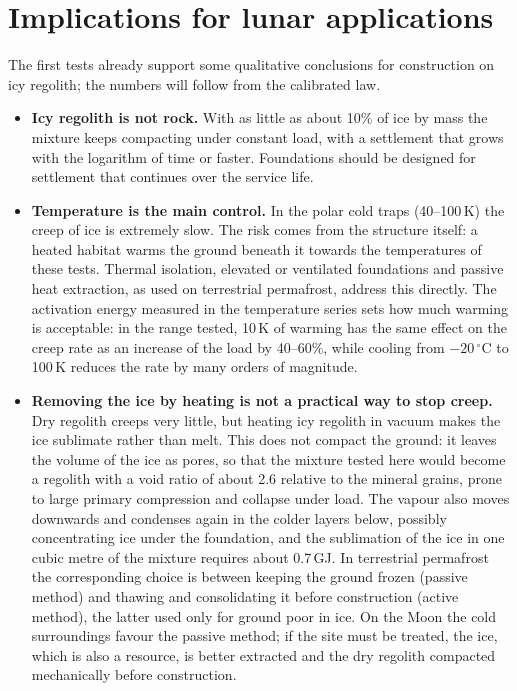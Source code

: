 \section{Implications for lunar applications}
\label{sec:implications}

The first tests already support some qualitative conclusions for construction on icy regolith; the numbers will follow from the calibrated law.
\begin{itemize}
    \item \textbf{Icy regolith is not rock.} With as little as about 10\% of ice by mass the mixture keeps compacting under constant load, with a settlement that grows with the logarithm of time or faster. Foundations should be designed for settlement that continues over the service life.
    \item \textbf{Temperature is the main control.} In the polar cold traps (40--100\,K) the creep of ice is extremely slow. The risk comes from the structure itself: a heated habitat warms the ground beneath it towards the temperatures of these tests. Thermal isolation, elevated or ventilated foundations and passive heat extraction, as used on terrestrial permafrost, address this directly. The activation energy measured in the temperature series sets how much warming is acceptable: in the range tested, 10\,K of warming has the same effect on the creep rate as an increase of the load by 40--60\%, while cooling from $-20\,^\circ$C to 100\,K reduces the rate by many orders of magnitude.
    \item \textbf{Removing the ice by heating is not a practical way to stop creep.} Dry regolith creeps very little, but heating icy regolith in vacuum makes the ice sublimate rather than melt. This does not compact the ground: it leaves the volume of the ice as pores, so that the mixture tested here would become a regolith with a void ratio of about 2.6 relative to the mineral grains, prone to large primary compression and collapse under load. The vapour also moves downwards and condenses again in the colder layers below, possibly concentrating ice under the foundation, and the sublimation of the ice in one cubic metre of the mixture requires about 0.7\,GJ. In terrestrial permafrost the corresponding choice is between keeping the ground frozen (passive method) and thawing and consolidating it before construction (active method), the latter used only for ground poor in ice. On the Moon the cold surroundings favour the passive method; if the site must be treated, the ice, which is also a resource, is better extracted and the dry regolith compacted mechanically before construction.

\end{itemize}
